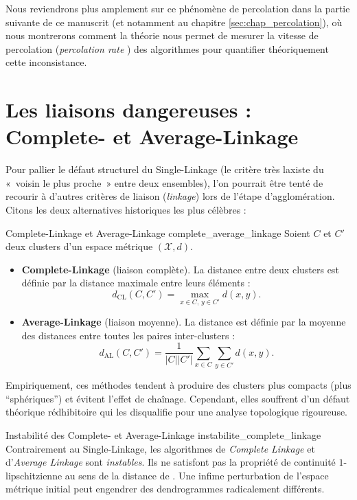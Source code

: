 Nous reviendrons plus amplement sur ce phénomène de percolation dans la partie suivante de ce manuscrit (et notamment au chapitre \ref{sec:chap_percolation}), où nous montrerons comment la théorie nous permet de mesurer la vitesse de percolation (\emph{percolation rate} \cite{BibiVenise, BibiIstambul}) des algorithmes pour quantifier théoriquement cette inconsistance.


\section{Les liaisons dangereuses : Complete- et Average-Linkage}

Pour pallier le défaut structurel du Single-Linkage (le critère très laxiste du «~voisin le plus proche~» entre deux ensembles), l'on pourrait être tenté de recourir à d'autres critères de liaison (\emph{linkage}) lors de l'étape d'agglomération. Citons les deux alternatives historiques les plus célèbres :

\begin{Definition}{Complete-Linkage \cite{Sorensen1948} et Average-Linkage \cite{SokalMichener1958}}{complete_average_linkage}
Soient $C$ et $C'$ deux clusters d'un espace métrique $(\mathcal X, d)$.
\begin{itemize}
    \item \textbf{Complete-Linkage} (liaison complète). La distance entre deux clusters est définie par la distance maximale entre leurs éléments :
    \[
    \boxed{
        d_{\mathrm{CL}}(C, C') = \max_{x \in C, \, y \in C'} d(x,y).
        }
    \]
    \item \textbf{Average-Linkage} (liaison moyenne). La distance est définie par la moyenne des distances entre toutes les paires inter-clusters :
    \[
    \boxed{
        d_{\mathrm{AL}}(C, C') = \frac{1}{|C| |C'|} \sum_{x \in C} \sum_{y \in C'} d(x,y).
        }
    \]
\end{itemize}
\end{Definition}

Empiriquement, ces méthodes tendent à produire des clusters plus compacts (plus ``sphériques'') et évitent l'effet de chaînage. Cependant, elles souffrent d'un défaut théorique rédhibitoire qui les disqualifie pour une analyse topologique rigoureuse.

\begin{Resultat}{Instabilité des Complete- et Average-Linkage \cite{CarlssonMemoli2010}}{instabilite_complete_linkage}
Contrairement au Single-Linkage, les algorithmes de \emph{Complete Linkage} et d'\emph{Average Linkage} sont \emph{instables}. Ils ne satisfont pas la propriété de continuité $1$-lipschitzienne au sens de la distance de . Une infime perturbation de l'espace métrique initial peut engendrer des dendrogrammes radicalement différents.
\end{Resultat}


